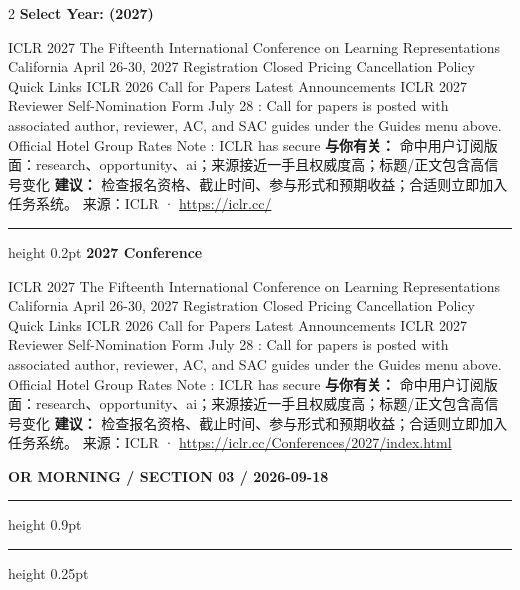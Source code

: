 \documentclass[10.5pt]{ctexart}
\begin{document}
\begin{multicols}{2}
{\large\bfseries Select Year: (2027)}\par
ICLR 2027 The Fifteenth International Conference on Learning Representations California April 26-30, 2027 Registration Closed Pricing Cancellation Policy Quick Links ICLR 2026 Call for Papers Latest Announcements ICLR 2027 Reviewer Self-Nomination Form July 28 : Call for papers is posted with associated author, reviewer, AC, and SAC guides under the Guides menu above. Official Hotel Group Rates Note : ICLR has secure
\textbf{与你有关：} 命中用户订阅版面：research、opportunity、ai；来源接近一手且权威度高；标题/正文包含高信号变化
\textbf{建议：} 检查报名资格、截止时间、参与形式和预期收益；合适则立即加入任务系统。
{\footnotesize\color{ormuted} 来源：ICLR · \url{https://iclr.cc/}}
\vspace{2mm}
\hrule height 0.2pt
\vspace{2mm}
{\large\bfseries 2027 Conference}\par
ICLR 2027 The Fifteenth International Conference on Learning Representations California April 26-30, 2027 Registration Closed Pricing Cancellation Policy Quick Links ICLR 2026 Call for Papers Latest Announcements ICLR 2027 Reviewer Self-Nomination Form July 28 : Call for papers is posted with associated author, reviewer, AC, and SAC guides under the Guides menu above. Official Hotel Group Rates Note : ICLR has secure
\textbf{与你有关：} 命中用户订阅版面：research、opportunity、ai；来源接近一手且权威度高；标题/正文包含高信号变化
\textbf{建议：} 检查报名资格、截止时间、参与形式和预期收益；合适则立即加入任务系统。
{\footnotesize\color{ormuted} 来源：ICLR · \url{https://iclr.cc/Conferences/2027/index.html}}
\end{multicols}
\newpage
{\small\bfseries OR MORNING / SECTION 03 / 2026-09-18}
\vspace{2mm}
\hrule height 0.9pt
\vspace{1.5mm}
\hrule height 0.25pt
\vspace{4mm}
\end{document}
